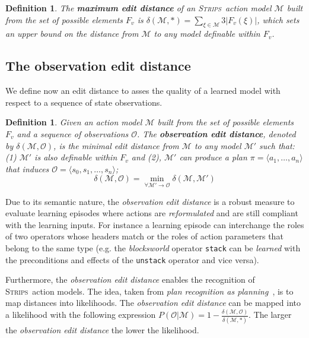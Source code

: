\documentclass{article}
\newcommand{\tup}[1]{{\langle #1 \rangle}}
\newcommand{\strips}{\textsc{Strips}}     %
\newtheorem{definition}[theorem]{Definition}
\begin{document}
\begin{definition}
The \textbf{maximum edit distance} of an \strips\ action model $\mathcal{M}$ built from the set of possible elements $F_v$ is $\delta(\mathcal{M},*)=\sum_{\xi\in\mathcal{M}} 3|F_v(\xi)|$, which sets an upper bound on the distance from $\mathcal{M}$ to any model definable within $F_v$.
\end{definition}


\subsection{The observation edit distance}

We define now an edit distance to asses the quality of a learned model with respect to a sequence of state observations.

\begin{definition}
Given an action model $\mathcal{M}$ built from the set of possible elements $F_v$ and a sequence of observations $\mathcal{O}$. The {\bf observation edit distance}, denoted by  $\delta(\mathcal{M},\mathcal{O})$, is the minimal edit distance from $\mathcal{M}$ to any model $\mathcal{M}'$ such that: (1) $\mathcal{M}'$ is also definable within $F_v$ and (2), $\mathcal{M}'$ can produce a plan $\pi=\tup{a_1, \ldots, a_n}$ that induces $\mathcal{O}=\tup{s_0, s_1, \ldots, s_n}$; \[\delta(\mathcal{M},\mathcal{O})=\min_{\forall \mathcal{M}' \rightarrow \mathcal{O}} \delta(\mathcal{M},\mathcal{M}')\]
\end{definition}

Due to its semantic nature, the {\em observation edit distance} is a robust measure to evaluate learning episodes where actions are {\em reformulated} and are still compliant with the learning inputs. For instance a learning episode can interchange the roles of two operators whose headers match or the roles of action parameters that belong to the same type (e.g. the {\em blocksworld} operator {\small\tt stack} can be {\em learned} with the preconditions and effects of the {\small\tt unstack} operator and vice versa).

Furthermore, the {\em observation edit distance} enables the recognition of \strips\ action models. The idea, taken from {\em plan recognition as planning}~\cite{ramirez2009plan}, is to map distances into likelihoods. The {\em observation edit distance} can be mapped into a likelihood with the following expression $P(\mathcal{O}|\mathcal{M})=1-\frac{\delta(\mathcal{M},\mathcal{O})}{\delta(\mathcal{M},*)}$. The larger the {\em observation edit distance} the lower the likelihood.
\end{document}

